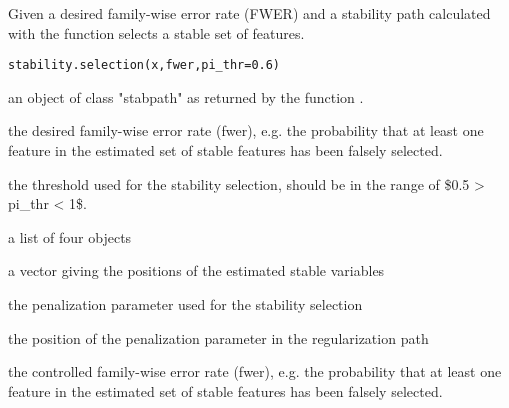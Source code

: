 \documentclass[letterpaper]{book}
\begin{document}
%
\begin{Description}\relax
Given a desired family-wise error rate (FWER) and a stability path calculated with  the function selects a stable set of features.
\end{Description}
%
\begin{Usage}
\begin{verbatim}
stability.selection(x,fwer,pi_thr=0.6)
\end{verbatim}
\end{Usage}
%
\begin{Arguments}
\begin{ldescription}
\item[\code{x}] 
an object of class "stabpath" as returned by the function .

\item[\code{fwer}] 
the desired family-wise error rate (fwer), e.g. the probability that at least one feature in the estimated set of stable features has been falsely selected. 

\item[\code{pi\_thr}] 
the threshold used for the stability selection, should be in the range of \$0.5 > pi\_thr < 1\$.  

\end{ldescription}
\end{Arguments}
%
\begin{Value}
a list of four objects
\begin{ldescription}
\item[\code{stable}] 
a vector giving the positions of the estimated stable variables 

\item[\code{lambda}] 
the penalization parameter used for the stability selection 

\item[\code{lpos}] 
the position of the penalization parameter in the regularization path

\item[\code{fwer}] 
the controlled family-wise error rate (fwer), e.g. the probability that at least one feature in the estimated set of stable features     has been falsely selected.

\end{ldescription}
\end{Value}
\end{document}
